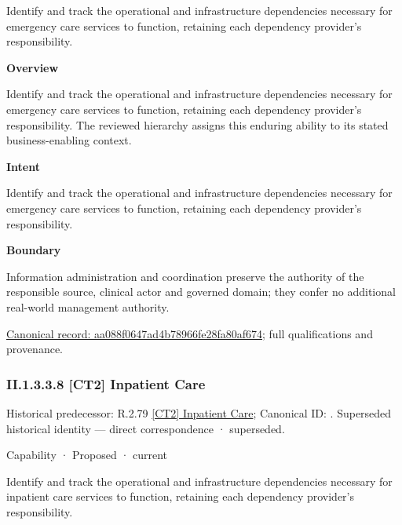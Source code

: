 Identify and track the operational and infrastructure dependencies necessary for emergency care services to function, retaining each dependency provider's responsibility.



\textbf{Overview}



Identify and track the operational and infrastructure dependencies necessary for emergency care services to function, retaining each dependency provider's responsibility. The reviewed hierarchy assigns this enduring ability to its stated business-enabling context.



\textbf{Intent}



Identify and track the operational and infrastructure dependencies necessary for emergency care services to function, retaining each dependency provider's responsibility.



\textbf{Boundary}



Information administration and coordination preserve the authority of the responsible source, clinical actor and governed domain; they confer no additional real-world management authority.


{\footnotesize \href{../../../../../../../continuum/strategy/capability/aa088f0647ad4b78966fe28fa80af674.md}{Canonical record: aa088f0647ad4b78966fe28fa80af674}; full qualifications and provenance.}\par
\subsubsection*{II.1.3.3.8 [CT2] Inpatient Care}
\label{navigation:II.1.3.3.8}

{\small Historical predecessor: R.2.79 \hyperref[element:bcc40a14465e48aca42c9505a6853081]{[CT2] Inpatient Care}; Canonical ID: \texttt{}. Superseded historical identity — direct correspondence · superseded.}\par
\label{element:b39fb49c01b545a5b51d3313531efb1b}
{\small Capability · Proposed · current}\par

Identify and track the operational and infrastructure dependencies necessary for inpatient care services to function, retaining each dependency provider's responsibility.



